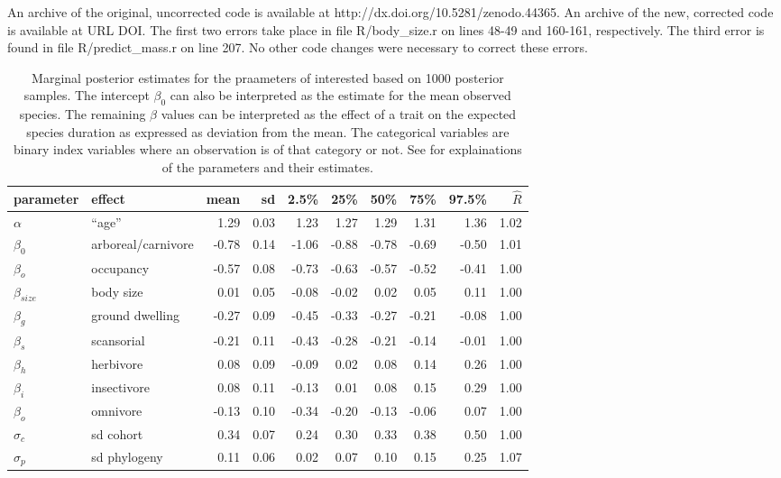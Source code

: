 \documentclass{article}
\begin{document}
An archive of the original, uncorrected code is available at http://dx.doi.org/10.5281/zenodo.44365. An archive of the new, corrected code is available at URL DOI. The first two errors take place in file R/body\_size.r on lines 48-49 and 160-161, respectively. The third error is found in file R/predict\_mass.r on line 207. No other code changes were necessary to correct these errors.


\begin{table}[c]
  \centering
  \caption{Marginal posterior estimates for the praameters of interested based on 1000 posterior samples. The intercept \(\beta_{0}\) can also be interpreted as the estimate for the mean observed species. The remaining \(\beta\) values can be interpreted as the effect of a trait on the expected species duration as expressed as deviation from the mean. The categorical variables are binary index variables where an observation is of that category or not. See \citet{Smits2015} for explainations of the parameters and their estimates.}
  \begin{tabular}{ l l r r r r r r r r }
    parameter & effect & mean & sd & 2.5\% & 25\% & 50\% & 75\% & 97.5\% & \(\hat{R}\) \\ 
    \hline
    \(\alpha\) & ``age'' &1.29 & 0.03 & 1.23 & 1.27 & 1.29 & 1.31 & 1.36 & 1.02 \\ 
    \hline
    \(\beta_{0}\) & arboreal/carnivore & -0.78 & 0.14 & -1.06 & -0.88 & -0.78 & -0.69 & -0.50 & 1.01 \\ 
    \(\beta_{o}\) & occupancy & -0.57 & 0.08 & -0.73 & -0.63 & -0.57 & -0.52 & -0.41 & 1.00 \\ 
    \(\beta_{size}\) & body size & 0.01 & 0.05 & -0.08 & -0.02 & 0.02 & 0.05 & 0.11 & 1.00 \\ 
    \(\beta_{g}\) & ground dwelling & -0.27 & 0.09 & -0.45 & -0.33 & -0.27 & -0.21 & -0.08 & 1.00 \\ 
    \(\beta_{s}\) & scansorial & -0.21 & 0.11 & -0.43 & -0.28 & -0.21 & -0.14 & -0.01 & 1.00 \\ 
    \(\beta_{h}\) & herbivore & 0.08 & 0.09 & -0.09 & 0.02 & 0.08 & 0.14 & 0.26 & 1.00 \\ 
    \(\beta_{i}\) & insectivore & 0.08 & 0.11 & -0.13 & 0.01 & 0.08 & 0.15 & 0.29 & 1.00 \\ 
    \(\beta_{o}\) & omnivore & -0.13 & 0.10 & -0.34 & -0.20 & -0.13 & -0.06 & 0.07 & 1.00 \\ 
    \hline
    \(\sigma_{c}\) & sd cohort & 0.34 & 0.07 & 0.24 & 0.30 & 0.33 & 0.38 & 0.50 & 1.00 \\ 
    \(\sigma_{p}\) & sd phylogeny & 0.11 & 0.06 & 0.02 & 0.07 & 0.10 & 0.15 & 0.25 & 1.07 \\ 
    \hline
  \end{tabular}
  \label{tab:new_res}
\end{table}





%

\end{document}
